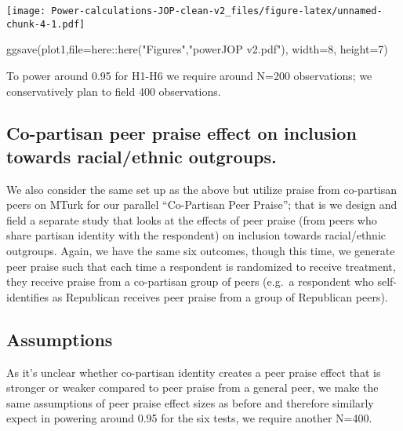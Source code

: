 \documentclass[
]{article}
\newenvironment{Shaded}{\begin{snugshade}}{\end{snugshade}}
\newcommand{\AttributeTok}[1]{\textcolor[rgb]{0.77,0.63,0.00}{#1}}
\newcommand{\DecValTok}[1]{\textcolor[rgb]{0.00,0.00,0.81}{#1}}
\newcommand{\FunctionTok}[1]{\textcolor[rgb]{0.00,0.00,0.00}{#1}}
\newcommand{\NormalTok}[1]{#1}
\newcommand{\SpecialCharTok}[1]{\textcolor[rgb]{0.00,0.00,0.00}{#1}}
\newcommand{\StringTok}[1]{\textcolor[rgb]{0.31,0.60,0.02}{#1}}
\begin{document}
\texttt{[image: Power-calculations-JOP-clean-v2\_files/figure-latex/unnamed-chunk-4-1.pdf]}

\begin{Shaded}
\begin{Highlighting}[]
\FunctionTok{ggsave}\NormalTok{(plot1,}\AttributeTok{file=}\NormalTok{here}\SpecialCharTok{::}\FunctionTok{here}\NormalTok{(}\StringTok{"Figures"}\NormalTok{,}\StringTok{"powerJOP v2.pdf"}\NormalTok{), }\AttributeTok{width=}\DecValTok{8}\NormalTok{, }\AttributeTok{height=}\DecValTok{7}\NormalTok{)}
\end{Highlighting}
\end{Shaded}

To power around 0.95 for H1-H6 we require around N=200 observations; we
conservatively plan to field 400 observations.

\hypertarget{co-partisan-peer-praise-effect-on-inclusion-towards-racialethnic-outgroups.}{%
\subsection{Co-partisan peer praise effect on inclusion towards
racial/ethnic
outgroups.}\label{co-partisan-peer-praise-effect-on-inclusion-towards-racialethnic-outgroups.}}

We also consider the same set up as the above but utilize praise from
co-partisan peers on MTurk for our parallel ``Co-Partisan Peer Praise'';
that is we design and field a separate study that looks at the effects
of peer praise (from peers who share partisan identity with the
respondent) on inclusion towards racial/ethnic outgroups. Again, we have
the same six outcomes, though this time, we generate peer praise such
that each time a respondent is randomized to receive treatment, they
receive praise from a co-partisan group of peers (e.g.~a respondent who
self-identifies as Republican receives peer praise from a group of
Republican peers).

\hypertarget{assumptions-1}{%
\subsection{Assumptions}\label{assumptions-1}}

As it's unclear whether co-partisan identity creates a peer praise
effect that is stronger or weaker compared to peer praise from a general
peer, we make the same assumptions of peer praise effect sizes as before
and therefore similarly expect in powering around 0.95 for the six
tests, we require another N=400.
\end{document}
